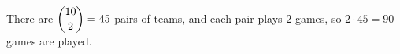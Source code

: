 There are $\dbinom{10}{2}=45$ pairs of teams, and each pair plays $2$ games, so $2\cdot45=\boxed{90}$ games are played.
